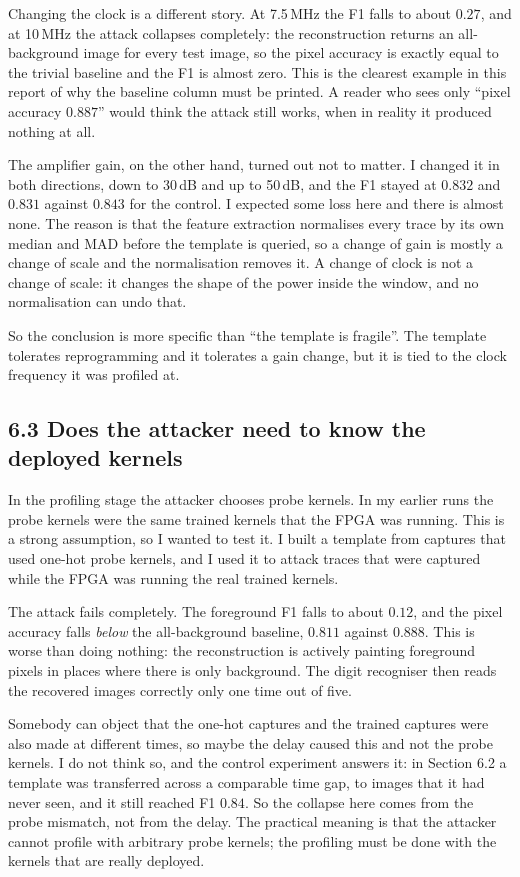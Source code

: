 \documentclass[11pt,a4paper]{article}
\begin{document}
Changing the clock is a different story. At 7.5\,MHz the F1 falls to about $0.27$, and
at 10\,MHz the attack collapses completely: the reconstruction returns an all-background
image for every test image, so the pixel accuracy is exactly equal to the trivial
baseline and the F1 is almost zero. This is the clearest example in this report of why
the baseline column must be printed. A reader who sees only ``pixel accuracy $0.887$''
would think the attack still works, when in reality it produced nothing at all.

The amplifier gain, on the other hand, turned out not to matter. I changed it in both
directions, down to 30\,dB and up to 50\,dB, and the F1 stayed at $0.832$ and $0.831$
against $0.843$ for the control. I expected some loss here and there is almost none. The
reason is that the feature extraction normalises every trace by its own median and MAD
before the template is queried, so a change of gain is mostly a change of scale and the
normalisation removes it. A change of clock is not a change of scale: it changes the
shape of the power inside the window, and no normalisation can undo that.

So the conclusion is more specific than ``the template is fragile''. The template
tolerates reprogramming and it tolerates a gain change, but it is tied to the clock
frequency it was profiled at.

\subsection*{6.3 Does the attacker need to know the deployed kernels}

In the profiling stage the attacker chooses probe kernels. In my earlier runs the probe
kernels were the same trained kernels that the FPGA was running. This is a strong
assumption, so I wanted to test it. I built a template from captures that used one-hot
probe kernels, and I used it to attack traces that were captured while the FPGA was
running the real trained kernels.

The attack fails completely. The foreground F1 falls to about $0.12$, and the pixel
accuracy falls \emph{below} the all-background baseline, $0.811$ against $0.888$. This
is worse than doing nothing: the reconstruction is actively painting foreground pixels
in places where there is only background. The digit recogniser then reads the recovered
images correctly only one time out of five.

Somebody can object that the one-hot captures and the trained captures were also made at
different times, so maybe the delay caused this and not the probe kernels. I do not
think so, and the control experiment answers it: in Section 6.2 a template was
transferred across a comparable time gap, to images that it had never seen, and it still
reached F1 $0.84$. So the collapse here comes from the probe mismatch, not from the
delay. The practical meaning is that the attacker cannot profile with arbitrary probe
kernels; the profiling must be done with the kernels that are really deployed.
\end{document}
